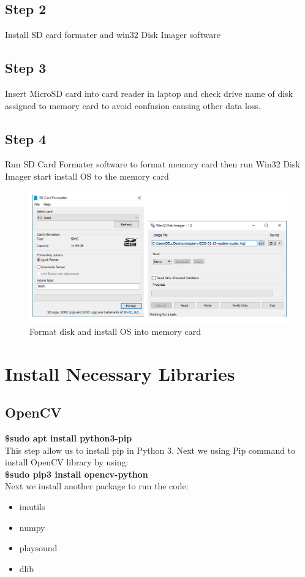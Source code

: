     \subsection{Step 2}
        Install SD card formater and win32 Disk Imager software
    \subsection{Step 3}
        Insert MicroSD card into card reader in laptop and check drive name of disk assigned to memory card to avoid 
        confusion causing other data loss. 
    \subsection{Step 4}
        Run SD Card Formater software to format memory card then run Win32 Disk Imager start install OS to the memory card
        \begin{figure}[H]
            \centering
            \includegraphics[width=0.6\linewidth]{img/format-disk.PNG}
            \caption{Format disk and install OS into memory card}
        \end{figure}
\section{Install Necessary Libraries}
    \subsection{OpenCV}
        \textbf{\$sudo apt install python3-pip} \\ 
        \vspace{3mm}
        This step allow us to install pip in Python 3. Next we using Pip command to install OpenCV library by using: \\ 
        \vspace{3mm}
        \textbf{\$sudo pip3 install opencv-python} \\ 
        \vspace{3mm}
        Next we install another package to run the code: 
        \begin{itemize}
            \item imutils
            \item numpy
            \item playsound 
            \item dlib
        \end{itemize}
